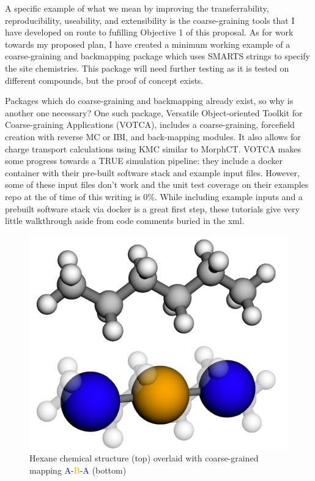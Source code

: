 A specific example of what we mean by improving the transferrability, reproducibility, useability, and extensibility is the coarse-graining tools that I have developed on route to fufilling Objective 1 of this proposal.
As for work towards my proposed plan, I have created a minimum working example of a coarse-graining and backmapping package which uses SMARTS strings to specify the site chemistries\cite{grits}.
This package will need further testing as it is tested on different compounds, but the proof of concept exists.

Packages which do coarse-graining and backmapping already exist, so why is another one necessary?
One such package, Versatile Object-oriented Toolkit for Coarse-graining Applications (VOTCA)\cite{Ruhle2011b}, includes a coarse-graining, forcefield creation with reverse MC or IBI, and back-mapping modules.
It also allows for charge transport calculations using KMC similar to MorphCT\cite{Lukyanov2010}.
VOTCA makes some progress towards a TRUE simulation pipeline: they include a docker container with their pre-built software stack and example input files.
However, some of these input files don't work and the unit test coverage on their examples repo at the of time of this writing is 0\%.
While including example inputs and a prebuilt software stack via docker is a great first step, these tutorials give very little walkthrough aside from code comments buried in the xml\cite{votca-github}.
\begin{figure}
    \centering
    \includegraphics[width=\linewidth]{images/hexane-compare.pdf}
    \caption{Hexane chemical structure (top) overlaid with coarse-grained mapping \textcolor{blue}{A}-\textcolor{orange}{B}-\textcolor{blue}{A} (bottom)}\label{hexane}
\end{figure}
